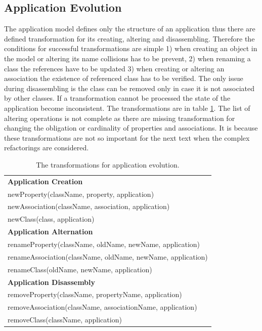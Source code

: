 \documentclass[11pt]{article}
\begin{document}
\subsection{Application Evolution}
\label{sec:app-evolution}
The application model defines only the structure of an application thus there are defined transformation for its creating, altering and disassembling. Therefore the conditions for successful transformations are simple 1) when creating an object in the model or altering its name collisions has to be prevent, 2) when renaming a class the references have to be updated 3) when creating or altering an association the existence of referenced class has to be verified. The only issue during disassembling is the class can be removed only in case it is not associated by other classes. If a transformation cannot be processed the state of the application become inconsistent. The transformations are in table \ref{tab:app-evolution}. The list of altering operations is not complete as there are missing transformation for changing the obligation or cardinality of properties and associations. It is because these transformations are not so important for the next text when the complex refactorings are considered. 
\begin{table}
\centering
	\begin{tabular}{|l|}
	\hline
	\textbf{Application Creation} \\
	newProperty(className, property, application) \\
	newAssociation(className, association, application) \\
	newClass(class, application) \\
	\textbf{Application Alternation} \\
	renameProperty(className, oldName, newName, application) \\
	renameAssociation(className, oldName, newName, application) \\
	renameClass(oldName, newName, application)\\
	\textbf{Application Disassembly} \\
	removeProperty(className, propertyName, application) \\
	removeAssociation(className, associationName, application) \\
	removeClass(className, application)\\
	\hline
	\end{tabular}
	\caption{The transformations for application evolution.}
	\label{tab:app-evolution}
\end{table}
\end{document}
